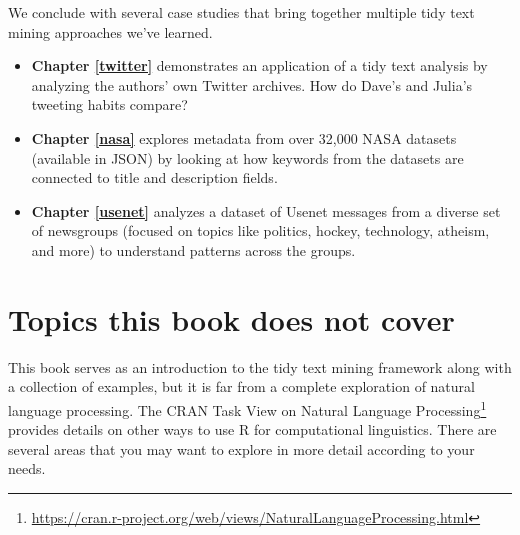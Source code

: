\documentclass[
]{book}
\DeclareRobustCommand{\href}[2]{#2\footnote{\url{#1}}}
\providecommand{\tightlist}{%
  \setlength{\itemsep}{0pt}\setlength{\parskip}{0pt}}
\begin{document}
We conclude with several case studies that bring together multiple tidy text mining approaches we've learned.

\begin{itemize}
\tightlist
\item
  \textbf{Chapter \ref{twitter}} demonstrates an application of a tidy text analysis by analyzing the authors' own Twitter archives. How do Dave's and Julia's tweeting habits compare?
\item
  \textbf{Chapter \ref{nasa}} explores metadata from over 32,000 NASA datasets (available in JSON) by looking at how keywords from the datasets are connected to title and description fields.
\item
  \textbf{Chapter \ref{usenet}} analyzes a dataset of Usenet messages from a diverse set of newsgroups (focused on topics like politics, hockey, technology, atheism, and more) to understand patterns across the groups.
\end{itemize}

\hypertarget{topics-this-book-does-not-cover}{%
\section*{Topics this book does not cover}\label{topics-this-book-does-not-cover}}

This book serves as an introduction to the tidy text mining framework along with a collection of examples, but it is far from a complete exploration of natural language processing. The \href{https://cran.r-project.org/web/views/NaturalLanguageProcessing.html}{CRAN Task View on Natural Language Processing} provides details on other ways to use R for computational linguistics. There are several areas that you may want to explore in more detail according to your needs.
\end{document}
